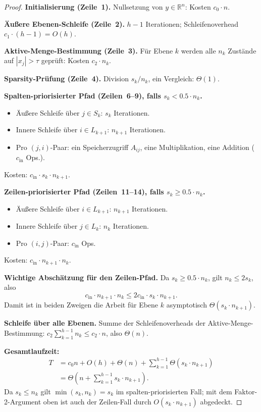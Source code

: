 \documentclass[a4paper,12pt]{report}
\theoremstyle{definition}
\begin{document}
	\begin{proof}
		\textbf{Initialisierung (Zeile~1).} Nullsetzung von $y \in \mathbb{R}^n$: Kosten $c_0 \cdot n$.

		\textbf{Äußere Ebenen-Schleife (Zeile~2).} $h-1$ Iterationen; Schleifenoverhead $c_1 \cdot (h-1) = O(h)$.

		\textbf{Aktive-Menge-Bestimmung (Zeile~3).} Für Ebene $k$ werden alle $n_k$ Zustände auf $|x_j| > \tau$ geprüft: Kosten $c_2 \cdot n_k$.

		\textbf{Sparsity-Prüfung (Zeile~4).} Division $s_k / n_k$, ein Vergleich: $\Theta(1)$.

		\textbf{Spalten-priorisierter Pfad (Zeilen~6--9), falls $s_k < 0.5 \cdot n_k$.}
		\begin{itemize}
			\item Äußere Schleife über $j \in S_k$: $s_k$ Iterationen.
			\item Innere Schleife über $i \in L_{k+1}$: $n_{k+1}$ Iterationen.
			\item Pro $(j,i)$-Paar: ein Speicherzugriff $A_{ij}$, eine Multiplikation, eine Addition ($c_{\mathrm{in}}$ Ops.).
		\end{itemize}
		Kosten: $c_{\mathrm{in}} \cdot s_k \cdot n_{k+1}$.

		\textbf{Zeilen-priorisierter Pfad (Zeilen~11--14), falls $s_k \geq 0.5 \cdot n_k$.}
		\begin{itemize}
			\item Äußere Schleife über $i \in L_{k+1}$: $n_{k+1}$ Iterationen.
			\item Innere Schleife über $j \in L_k$: $n_k$ Iterationen.
			\item Pro $(i,j)$-Paar: $c_{\mathrm{in}}$ Ops.
		\end{itemize}
		Kosten: $c_{\mathrm{in}} \cdot n_{k+1} \cdot n_k$.

		\textbf{Wichtige Abschätzung für den Zeilen-Pfad.} Da $s_k \geq 0.5 \cdot n_k$, gilt $n_k \leq 2 s_k$, also
		\[
			c_{\mathrm{in}} \cdot n_{k+1} \cdot n_k \leq 2 c_{\mathrm{in}} \cdot s_k \cdot n_{k+1}.
		\]
		Damit ist in beiden Zweigen die Arbeit für Ebene $k$ asymptotisch $\Theta(s_k \cdot n_{k+1})$.

		\textbf{Schleife über alle Ebenen.} Summe der Schleifenoverheads der Aktive-Menge-Bestimmung:
		$c_2 \sum_{k=1}^{h-1} n_k \leq c_2 \cdot n$,
		also $\Theta(n)$.

		\textbf{Gesamtlaufzeit:}
		\begin{align*}
			T &= c_0 n + O(h) + \Theta(n) + \sum_{k=1}^{h-1} \Theta(s_k \cdot n_{k+1}) \\
			&= \Theta\!\left(n + \sum_{k=1}^{h-1} s_k \cdot n_{k+1}\right).
		\end{align*}
		Da $s_k \leq n_k$ gilt $\min(s_k, n_k) = s_k$ im spalten-priorisierten Fall; mit dem Faktor-2-Argument oben ist auch der Zeilen-Fall durch $O(s_k \cdot n_{k+1})$ abgedeckt.


\end{proof}
\end{document}
